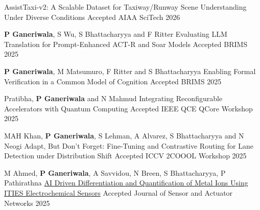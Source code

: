 \begin{cventries}
{AssistTaxi-v2: A Scalable Dataset for Taxiway/Runway Scene Understanding Under Diverse Conditions}
{Accepted}
{AIAA SciTech 2026} 
{ %
\begin{cvitems}
\end{cvitems}
}
\cventry
{\textbf{P Ganeriwala}, S Wu, S Bhattacharyya and F Ritter}
{
Evaluating LLM Translation for Prompt-Enhanced ACT-R and Soar Models}
{Accepted}
{BRIMS 2025} 
{ %
\begin{cvitems}
\end{cvitems}
}
\cventry
{\textbf{P Ganeriwala}, M Matsumuro, F Ritter and S Bhattacharyya}
{
Enabling Formal Verification in a Common Model of Cognition}
{Accepted}
{BRIMS 2025} 
{ %
\begin{cvitems}
\end{cvitems}
}
\cventry
{Pratibha, \textbf{P Ganeriwala} and N Mahmud}
{Integrating Reconfigurable Accelerators with Quantum Computing}
{Accepted}
{IEEE QCE QCore Workshop 2025} 
{ %
\begin{cvitems}
\end{cvitems}
}
\cventry
{MAH Khan, \textbf{P Ganeriwala}, S Lehman, A Alvarez, S Bhattacharyya and N Neogi}
{
Adapt, But Don’t Forget: Fine-Tuning and Contrastive Routing for Lane Detection under Distribution Shift}
{Accepted}
{ICCV 2COOOL Workshop 2025} 
{ %
\begin{cvitems}
\end{cvitems}
}
\cventry
{M Ahmed, \textbf{P Ganeriwala}, A Savvidou, N
Breen, S Bhattacharyya, P Pathirathna}
{
\href{https://www.mdpi.com/2224-2708/14/4/70}{AI Driven Differentiation and Quantification of Metal Ions Using ITIES Electrochemical Sensors}}
{Accepted}
{Journal of Sensor and Actuator Networks 2025} 

\end{cventries}

